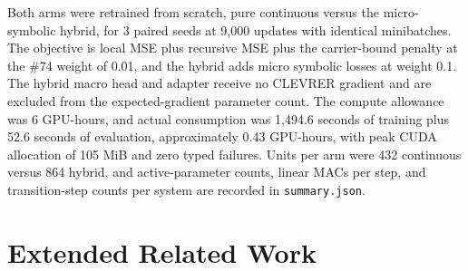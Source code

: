 Both arms were retrained from scratch, pure continuous versus the micro-symbolic hybrid, for 3 paired seeds at 9{,}000 updates with identical minibatches. The objective is local MSE plus recursive MSE plus the carrier-bound penalty at the \#74 weight of 0.01, and the hybrid adds micro symbolic losses at weight 0.1. The hybrid macro head and adapter receive no CLEVRER gradient and are excluded from the expected-gradient parameter count. The compute allowance was 6 GPU-hours, and actual consumption was 1{,}494.6 seconds of training plus 52.6 seconds of evaluation, approximately 0.43 GPU-hours, with peak CUDA allocation of 105 MiB and zero typed failures. Units per arm were 432 continuous versus 864 hybrid, and active-parameter counts, linear MACs per step, and transition-step counts per system are recorded in \texttt{summary.json}. 

\section{Extended Related Work}
\label{sec:app:related}

